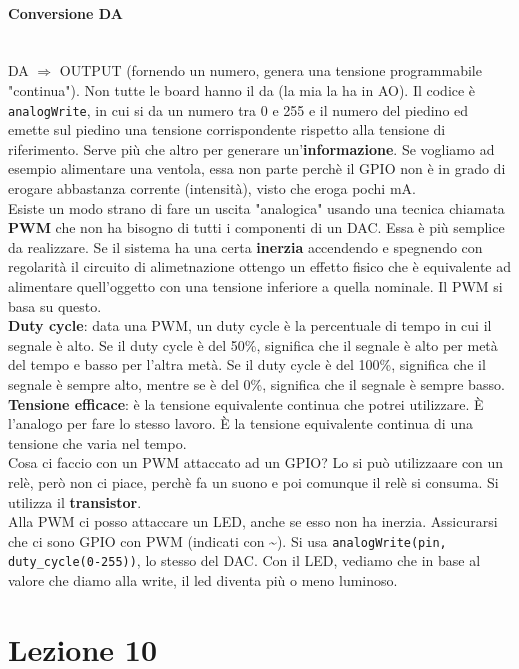 \documentclass{article}
\begin{document}
\paragraph{Conversione DA} \mbox{} \\
DA $\Rightarrow$ OUTPUT (fornendo un numero, genera una tensione programmabile "continua"). Non tutte le board hanno il da (la mia la ha in AO). Il codice è \texttt{analogWrite}, in cui si da un numero tra 0 e 255 e il numero del piedino ed emette sul piedino una tensione corrispondente rispetto alla tensione di riferimento.
Serve più che altro per generare un'\textbf{informazione}. Se vogliamo ad esempio alimentare una ventola, essa non parte perchè il GPIO non è in grado di erogare abbastanza corrente (intensità), visto che eroga pochi mA.
\\ Esiste un modo strano di fare un uscita "analogica" usando una tecnica chiamata \textbf{PWM} che non ha bisogno di tutti i componenti di un DAC. Essa è più semplice da realizzare. Se il sistema ha una certa \textbf{inerzia} accendendo e spegnendo con regolarità il circuito di alimetnazione ottengo un effetto fisico che è equivalente ad alimentare
quell'oggetto con una tensione inferiore a quella nominale. Il PWM si basa su questo.
\\\textbf{Duty cycle}: data una PWM, un duty cycle è la percentuale di tempo in cui il segnale è alto. Se il duty cycle è del 50\%, significa che il segnale è alto per metà del tempo e basso per l'altra metà. Se il duty cycle è del 100\%, significa che il segnale è sempre alto, mentre se è del 0\%, significa che il segnale è sempre basso.
\\ \textbf{Tensione efficace}: è la tensione equivalente continua che potrei utilizzare. È l'analogo per fare lo stesso lavoro. È la tensione equivalente continua di una tensione che varia nel tempo.
\\ Cosa ci faccio con un PWM attaccato ad un GPIO? Lo si può utilizzaare con un relè, però non ci piace, perchè fa un suono e poi comunque il relè si consuma. Si utilizza il \textbf{transistor}.
\\ Alla PWM ci posso attaccare un LED, anche se esso non ha inerzia. Assicurarsi che ci sono GPIO con PWM (indicati con \textasciitilde{}). Si usa \texttt{analogWrite(pin, duty\_cycle(0-255))}, lo stesso del DAC. Con il LED, vediamo che in base al valore che diamo alla write, il led diventa più o meno luminoso.
\section{Lezione 10}
\end{document}

